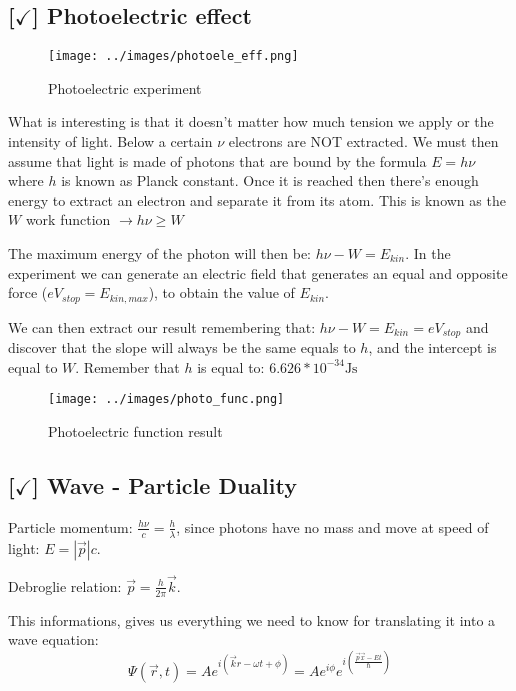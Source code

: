 \subsection{[$\checkmark$] Photoelectric effect}

\begin{figure}[ht]
	\centering
	\texttt{[image: ../images/photoele\_eff.png]}
	\caption{Photoelectric experiment}
	\label{fig:photoele_eff}
\end{figure}

What is interesting is that it doesn't matter how much tension we apply or the intensity of light. Below a certain $\nu$ electrons are NOT extracted. 
We must then assume that light is made of photons that are bound by the formula $E = h\nu$ where $h$ is known as Planck constant. Once it is reached then there's enough energy to extract an electron and separate it from its atom. This is known as the $W$ work function $\rightarrow h\nu \geq W$

\vspace{10pt}

The maximum energy of the photon will then be: $h\nu - W = E_{kin}$. In the experiment we can generate an electric field that generates an equal and opposite force ($eV_{stop} = E_{kin, max}$), to obtain the value of $E_{kin}$.

\hrulefill

We can then extract our result remembering that: $h\nu - W = E_{kin} = eV_{stop}$ and discover that the slope will always be the same equals to $h$, and the intercept is equal to $W$. Remember that $h$ is equal to: $6.626 * 10^{-34} \text{Js}$

\begin{figure}[ht]
	\centering
	\texttt{[image: ../images/photo\_func.png]}
	\caption{Photoelectric function result}
	\label{fig:photo_func}
\end{figure}

\subsection{[$\checkmark$] Wave - Particle Duality}

Particle momentum: $\frac{h\nu}{c} = \frac{h}{\lambda}$, since photons have no mass and move at speed of light: $E = |\vec{p}|c$.

\vspace{10pt}

Debroglie relation: $\vec{p} = \frac{h}{2\pi}\vec{k}$.

\vspace{10pt}

This informations, gives us everything we need to know for translating it into a wave equation: $$\Psi(\vec{r}, t) = A e^{i(\vec{k}{r} - \omega t + \phi)} = A e^{i\phi}e^{i(\frac{\vec{p}\vec{x} - Et}{\hbar})}$$

